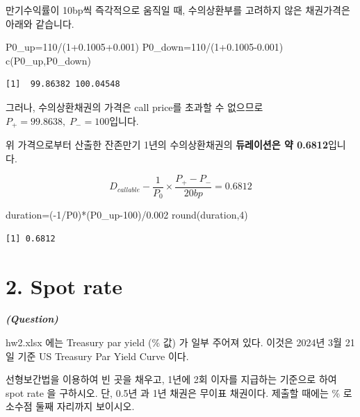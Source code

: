 \documentclass[
  a4paper,
  DIV=11,
  numbers=noendperiod]{scrreprt}
\newenvironment{Shaded}{\begin{snugshade}}{\end{snugshade}}
\newcommand{\DecValTok}[1]{\textcolor[rgb]{0.68,0.00,0.00}{#1}}
\newcommand{\FloatTok}[1]{\textcolor[rgb]{0.68,0.00,0.00}{#1}}
\newcommand{\FunctionTok}[1]{\textcolor[rgb]{0.28,0.35,0.67}{#1}}
\newcommand{\NormalTok}[1]{\textcolor[rgb]{0.00,0.23,0.31}{#1}}
\newcommand{\OtherTok}[1]{\textcolor[rgb]{0.00,0.23,0.31}{#1}}
\newcommand{\SpecialCharTok}[1]{\textcolor[rgb]{0.37,0.37,0.37}{#1}}
\begin{document}
만기수익률이 10bp씩 즉각적으로 움직일 때, 수의상환부를 고려하지 않은
채권가격은 아래와 같습니다.

\begin{Shaded}
\begin{Highlighting}[]
\NormalTok{P0\_up}\OtherTok{=}\DecValTok{110}\SpecialCharTok{/}\NormalTok{(}\DecValTok{1}\FloatTok{+0.1005+0.001}\NormalTok{)}
\NormalTok{P0\_down}\OtherTok{=}\DecValTok{110}\SpecialCharTok{/}\NormalTok{(}\DecValTok{1}\FloatTok{+0.1005{-}0.001}\NormalTok{)}
\FunctionTok{c}\NormalTok{(P0\_up,P0\_down)}
\end{Highlighting}
\end{Shaded}

\begin{verbatim}
[1]  99.86382 100.04548
\end{verbatim}

그러나, 수의상환채권의 가격은 call price를 초과할 수 없으므로
\textbf{\(P_+=99.8638,\;P_-=100\)}입니다.

위 가격으로부터 산출한 잔존만기 1년의 수의상환채권의 \textbf{듀레이션은
약 0.6812}입니다.

\[D_{callable}-\frac{1}{P_0}\times\frac{P_+-P_-}{20bp}=0.6812\]

\begin{Shaded}
\begin{Highlighting}[]
\NormalTok{duration}\OtherTok{=}\NormalTok{(}\SpecialCharTok{{-}}\DecValTok{1}\SpecialCharTok{/}\NormalTok{P0)}\SpecialCharTok{*}\NormalTok{(P0\_up}\DecValTok{{-}100}\NormalTok{)}\SpecialCharTok{/}\FloatTok{0.002}
\FunctionTok{round}\NormalTok{(duration,}\DecValTok{4}\NormalTok{)}
\end{Highlighting}
\end{Shaded}

\begin{verbatim}
[1] 0.6812
\end{verbatim}

\section*{2. Spot rate}\label{spot-rate}


\textbf{\emph{(Question)}}

hw2.xlsx 에는 Treasury par yield (\% 값) 가 일부 주어져 있다. 이것은
2024년 3월 21일 기준 US Treasury Par Yield Curve 이다.

선형보간법을 이용하여 빈 곳을 채우고, 1년에 2회 이자를 지급하는 기준으로
하여 spot rate 을 구하시오. 단, 0.5년 과 1년 채권은 무이표 채권이다.
제출할 때에는 \% 로 소수점 둘째 자리까지 보이시오.
\end{document}
